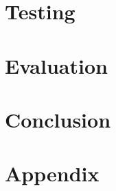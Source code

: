 \documentclass[12pt,a4paper]{article}
\begin{document}
\section{Testing}
\section{Evaluation}
\section{Conclusion}

\newpage


\cite{navaridas2009understanding}
\cite{sharp2012power}
\cite{davies2010interfacing}
\cite{sharp2011event}
\cite{gerstner2002spiking}
\cite{press2007numerical}
\cite{shewchuk1994introduction}
\cite{cgm2009lec}
\cite{o1987parallel}
\cite{adams1985m}
\cite{maheswaran1999mcgs}
\cite{yang2001improved}
\cite{adams1983m}
\cite{galiano2012gpu}
\cite{wozniak2010parallel}
\cite{hestenes1952methods}
\cite{rosenbloom1956method}
\cite{furber2007neural}
\cite{spinnweb}
\cite{khan2008spinnaker}
\cite{docfile}
\cite{plana2007gals}
\cite{furber2012overview}
\cite{bose2005spiking}
\cite{jefflec}
\cite{rast2012managing}
\section{Appendix}
\end{document}
